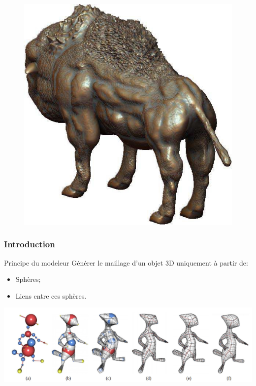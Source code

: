 \documentclass[10pt]{beamer}
\begin{document}
\begin{frame}
\begin{figure}[H]
{     		\includegraphics[scale=0.2]{images/detailedmesh.jpg}
     		\hspace*{0.5cm}  
  		}
	\end{figure}
\end{frame}

\begin{frame}
	\frametitle{Introduction}
	\begin{block}{Principe du modeleur}
		Générer le maillage d'un objet 3D uniquement à partir de:
		\begin{itemize}
			\item Sphères;
			\item Liens entre ces sphères.
		\end{itemize}
	\end{block}
	
	\begin{center}
		\includegraphics[scale=0.2]{images/bmesh.jpg}
	\end{center}
\end{frame}
\end{document}
